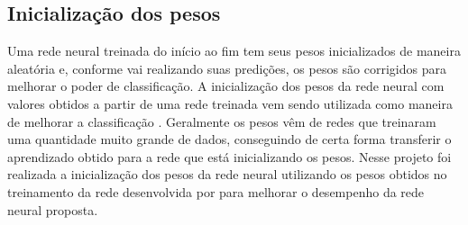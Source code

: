 \subsection{Inicialização dos pesos}
Uma rede neural treinada do início ao fim tem seus pesos inicializados de maneira aleatória e, conforme vai realizando suas predições, os pesos são corrigidos para melhorar o poder de classificação. A inicialização dos pesos da rede neural com valores obtidos a partir de uma rede treinada vem sendo utilizada como maneira de melhorar a classificação \cite{Girshick_2014_CVPR}. Geralmente os pesos vêm de redes que treinaram uma quantidade muito grande de dados, conseguindo de certa forma transferir o aprendizado obtido para a rede que está inicializando os pesos. Nesse projeto foi realizada a inicialização dos pesos da rede neural utilizando os pesos obtidos no treinamento da rede desenvolvida por  para melhorar o desempenho da rede neural proposta.




